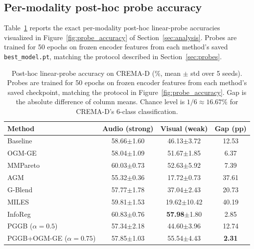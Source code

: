 \documentclass{article} %
\begin{document}
\subsection{Per-modality post-hoc probe accuracy}
\label{app:posthoc_probe_table}

Table~\ref{tab:probe_accuracy} reports the exact per-modality post-hoc linear-probe accuracies visualized in Figure~\ref{fig:probe_accuracy} of Section~\ref{sec:analysis}. Probes are trained for 50 epochs on frozen encoder features from each method's saved \texttt{best\_model.pt}, matching the protocol described in Section~\ref{sec:probes}.

\begin{table}[H]
\centering
\caption{Post-hoc linear-probe accuracy on CREMA-D (\%, mean $\pm$ std over 5 seeds). Probes are trained for 50 epochs on frozen encoder features from each method's saved checkpoint, matching the protocol in Figure~\ref{fig:probe_accuracy}. Gap is the absolute difference of column means. Chance level is $1/6 \approx 16.67\%$ for CREMA-D's 6-class classification.}
\label{tab:probe_accuracy}
\vspace{0.3em}
\begin{tabular}{lccc}
\toprule
\textbf{Method} & \textbf{Audio (strong)} & \textbf{Visual (weak)} & \textbf{Gap (pp)} \\
\midrule
Baseline                        & 58.66{\scriptsize$\pm$1.60}  & 46.13{\scriptsize$\pm$3.72}  & 12.53 \\
OGM-GE                          & 58.04{\scriptsize$\pm$1.09}  & 51.67{\scriptsize$\pm$1.85}  & 6.37 \\
MMPareto                        & 60.03{\scriptsize$\pm$0.73}  & 52.63{\scriptsize$\pm$5.92}  & 7.39 \\
AGM                             & 55.32{\scriptsize$\pm$0.36}  & 17.72{\scriptsize$\pm$0.73}  & 37.61 \\
G-Blend                         & 57.77{\scriptsize$\pm$1.78}  & 37.04{\scriptsize$\pm$2.43}  & 20.73 \\
MILES                           & 59.81{\scriptsize$\pm$1.53}  & 19.62{\scriptsize$\pm$10.42} & 40.19 \\
InfoReg                         & 60.83{\scriptsize$\pm$0.76}  & \textbf{57.98}{\scriptsize$\pm$1.80}  & 2.85 \\
PGGB ($\alpha{=}0.5$)           & 57.34{\scriptsize$\pm$2.18}  & 44.60{\scriptsize$\pm$3.96}  & 12.74 \\
PGGB+OGM-GE ($\alpha{=}0.75$)   & 57.85{\scriptsize$\pm$1.03}  & 55.54{\scriptsize$\pm$4.43}  & \textbf{2.31} \\
\bottomrule
\end{tabular}
\end{table}
\end{document}
